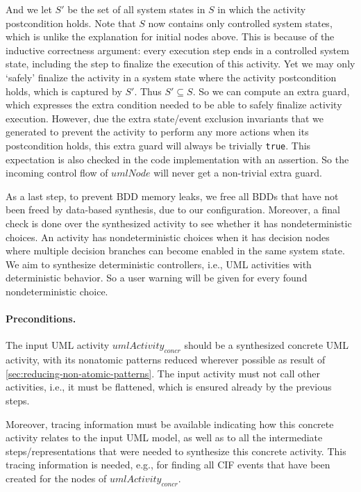 \documentclass{article}
\newcommand{\var}[1]{\ensuremath{\mathit{#1}}}
\theoremstyle{definition}
\begin{document}
\begin{itemize}
	And we let $S'$ be the set of all system states in $S$ in which the activity postcondition holds.
	Note that $S$ now contains only controlled system states, which is unlike the explanation for initial nodes above.
	This is because of the inductive correctness argument: every execution step ends in a controlled system state, including the step to finalize the execution of this activity.
	Yet we may only `safely' finalize the activity in a system state where the activity postcondition holds, which is captured by $S'$.
	Thus $S' \subseteq S$.
	So we can compute an extra guard, which expresses the extra condition needed to be able to safely finalize activity execution.
	However, due the extra state/event exclusion invariants that we generated to prevent the activity to perform any more actions when its postcondition holds, this extra guard will always be trivially \texttt{true}.
	This expectation is also checked in the code implementation with an assertion.
	So the incoming control flow of $\mathit{umlNode}$ will never get a non-trivial extra guard.
\end{itemize}

As a last step, to prevent BDD memory leaks, we free all BDDs that have not been freed by data-based synthesis, due to our configuration.
Moreover, a final check is done over the synthesized activity to see whether it has nondeterministic choices.
An activity has nondeterministic choices when it has decision nodes where multiple decision branches can become enabled in the same system state.
We aim to synthesize deterministic controllers, i.e., UML activities with deterministic behavior.
So a user warning will be given for every found nondeterministic choice.

\paragraph{Preconditions.}
The input UML activity \var{umlActivity_{concr}} should be a synthesized concrete UML activity, with its nonatomic patterns reduced wherever possible as result of \autoref{sec:reducing-non-atomic-patterns}.
The input activity must not call other activities, i.e., it must be flattened, which is ensured already by the previous steps.

Moreover, tracing information must be available indicating how this concrete activity relates to the input UML model, as well as to all the intermediate steps/representations that were needed to synthesize this concrete activity.
This tracing information is needed, e.g., for finding all CIF events that have been created for the nodes of \var{umlActivity_{concr}}.
\end{document}

